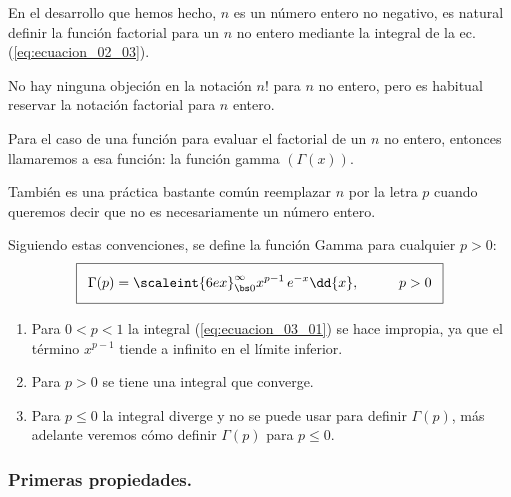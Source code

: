 En el desarrollo que hemos hecho, $n$ es un número entero no negativo, es natural definir la función factorial para un $n$ no entero mediante la integral de la ec.(\ref{eq:ecuacion_02_03}).
\par
No hay ninguna objeción en la notación $n!$ para $n$ no entero, pero es habitual reservar la notación factorial para $n$ entero.
\par
Para el caso de una función para evaluar el factorial de un $n$ no entero, entonces llamaremos a esa función: la función gamma $(\Gamma (x))$.
\par
También es una práctica bastante común reemplazar $n$ por la letra $p$ cuando queremos decir que no es necesariamente un número entero.
\par
Siguiendo estas convenciones, se define la función Gamma para cualquier $p > 0$:
\begin{align}\addtolength{\fboxsep}{5pt}\boxed{
\Gamma (p) = \scaleint{6ex}_{\bs 0}^{\infty} x^{p-1} \, e^{-x} \dd{x}, \hspace{1cm} p > 0}
\label{eq:ecuacion_03_01}
\end{align}
\begin{enumerate}
\item Para $0 < p < 1$ la integral (\ref{eq:ecuacion_03_01}) se hace impropia, ya que el término $x^{p-1}$ tiende a infinito en el límite inferior.
\item Para $p > 0$ se tiene una integral que converge.
\item Para $p \leq 0$ la integral diverge y no se puede usar para definir $\Gamma (p)$, más adelante veremos cómo definir  $\Gamma (p)$ para $p \leq 0$.
\end{enumerate}

\subsubsection{Primeras propiedades.}

